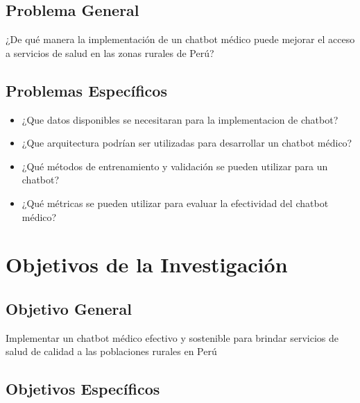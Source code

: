 
\subsection{Problema General}
\newcommand{\ProblemaGeneral}{
¿De qué manera la implementación de un chatbot médico puede mejorar el acceso a servicios de salud en las zonas rurales de Perú?
}
\ProblemaGeneral
\subsection{Problemas Espec\'{i}ficos}
\newcommand{\Pbone}{
¿Que datos disponibles se necesitaran para la implementacion de chatbot?
}
\newcommand{\Pbtwo}{
¿Que arquitectura podrían ser utilizadas para desarrollar un chatbot médico?
}
\newcommand{\Pbthree}{
¿Qué métodos de entrenamiento y validación se pueden utilizar para un chatbot?
}
\newcommand{\Pbfour}{
¿Qué métricas se pueden utilizar para evaluar la efectividad del chatbot médico?
}


\begin{itemize}
	\item \Pbone
	\item \Pbtwo
	\item \Pbthree
	\item \Pbfour

\end{itemize}

\section{Objetivos de la Investigación}

\subsection{Objetivo General}
\newcommand{\ObjetivoGeneral}{
Implementar un chatbot médico efectivo y sostenible para brindar servicios de salud de calidad a las poblaciones rurales en Perú
}
\ObjetivoGeneral
\subsection{Objetivos Espec\'{i}ficos}
\newcommand{\Objone}{
Identificar los datos disponibles y necesarios para la implementación del chatbot médico en áreas rurales de Perú.
}
\newcommand{\Objtwo}{
Explorar las diferentes arquitecturas disponibles para el desarrollo del chatbot médico.
}
\newcommand{\Objthree}{
Investigar métodos de entrenamiento y validación adecuados para un chatbot médico.
}
\newcommand{\Objfour}{
Definir métricas de evaluación para medir la efectividad y el impacto del chatbot médico en la prestación de servicios de la salud.
}

